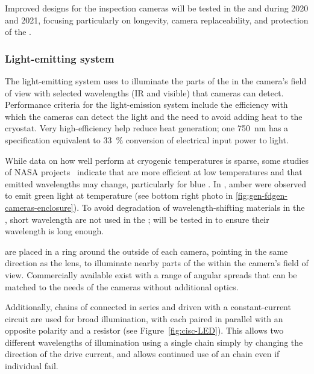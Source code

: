 Improved designs for the inspection cameras will be tested in the  and  during 2020 and 2021, focusing particularly on longevity, camera replaceability, and protection of the .


\subsubsection{Light-emitting system}
The light-emitting system uses  to illuminate
the parts of the %
 in the camera's field of view with selected
wavelengths (IR and visible) that cameras can detect.  Performance criteria for the light-emission system include the efficiency with which the cameras can detect the light and the need to avoid
adding heat to the cryostat. Very high-efficiency
help reduce heat generation; one \SI{750}{nm}  \cite{lumileds-DS144-pdf}
has a specification equivalent to
\SI{33}{\%} conversion of electrical input power to light.

While data on how well  perform at cryogenic temperatures
is sparse, some studies of NASA projects~\cite{Carron:2017zzz}
indicate that  are more efficient at low temperatures and
that emitted wavelengths may change, particularly for blue
.  In , amber  were observed  to
emit green light at  temperature (see bottom right photo
in \ref{fig:gen-fdgen-cameras-enclosure}).  To avoid degradation of
wavelength-shifting materials in the , short wavelength
 are not used in the ;  will be tested
in  to ensure their wavelength is long enough.


 are placed in a ring around the outside of each
camera, pointing in the same direction as the lens, to 
illuminate nearby parts of the  within the camera's field of
view. Commercially available  exist with
a range of angular spreads that can be matched to the needs of the
cameras without additional optics.

Additionally, chains of  connected in series and driven with a
constant-current circuit are used for broad illumination, with each
 paired in parallel with an opposite polarity  and a resistor
(see Figure~\ref{fig:cisc-LED}).
This allows two different wavelengths of illumination using a single chain simply by changing the direction of the drive current, and allows continued use of an  chain even if individual  fail.

